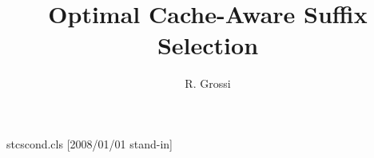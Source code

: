 \begin{filecontents*}{stcscond.cls}
[2008/01/01 stand-in]
\newif\if@stfinal
\let\st@address\address
\renewcommand{\address}[2][]{\if@stfinal\st@address[#1]{#2}\else\g@addto@macro\addresses{\address{#1}{#2}}\fi}
\def\@setaddresses{\par\begingroup\def\address##1##2{##2\par}%
  \def\curraddr##1##2{Current address: ##2\par}\def\email##1##2{E-mail address: ##2\par}%
  \def\urladdr##1##2{URL: ##2\par}\addresses\endgroup}
\def\@maketitle{\@settitle\ifx\@empty\authors\else\@setauthors\fi\@setaddresses}
\def\enddoc@text{}
\end{filecontents*}
\documentclass{stcscond}

\title{Optimal Cache-Aware Suffix Selection}
\author{R. Grossi}
\address{Dipartimento di Informatica, Universita di Pisa}
\maketitle
Body.

